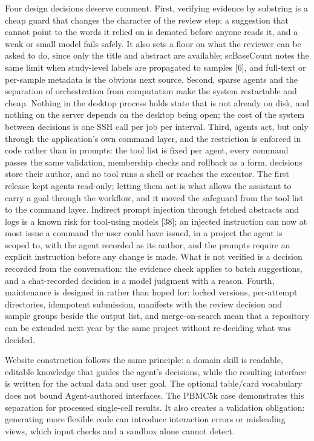 \documentclass[11pt,a4paper]{article}
\begin{document}
Four design decisions deserve comment. First, verifying evidence by
substring is a cheap guard that changes the character of the review
step: a suggestion that cannot point to the words it relied on is
demoted before anyone reads it, and a weak or small model fails safely.
It also sets a floor on what the reviewer can be asked to do, since only
the title and abstract are available; scBaseCount notes the same limit
when study-level labels are propagated to samples {[}6{]}, and full-text
or per-sample metadata is the obvious next source. Second, sparse agents
and the separation of orchestration from computation make the system
restartable and cheap. Nothing in the desktop process holds state that
is not already on disk, and nothing on the server depends on the desktop
being open; the cost of the system between decisions is one SSH call per
job per interval. Third, agents act, but only through the application's
own command layer, and the restriction is enforced in code rather than
in prompts: the tool list is fixed per agent, every command passes the
same validation, membership checks and rollback as a form, decisions
store their author, and no tool runs a shell or reaches the executor.
The first release kept agents read-only; letting them act is what allows
the assistant to carry a goal through the workflow, and it moved the
safeguard from the tool list to the command layer. Indirect prompt
injection through fetched abstracts and logs is a known risk for
tool-using models {[}38{]}; an injected instruction can now at most
issue a command the user could have issued, in a project the agent is
scoped to, with the agent recorded as its author, and the prompts
require an explicit instruction before any change is made. What is not
verified is a decision recorded from the conversation: the evidence
check applies to batch suggestions, and a chat-recorded decision is a
model judgment with a reason. Fourth, maintenance is designed in rather
than hoped for: locked versions, per-attempt directories, idempotent
submission, manifests with the review decision and sample groups beside
the output list, and merge-on-search mean that a repository can be
extended next year by the same project without re-deciding what was
decided.

Website construction follows the same principle: a domain skill is
readable, editable knowledge that guides the agent's decisions, while
the resulting interface is written for the actual data and user goal.
The optional table/card vocabulary does not bound Agent-authored
interfaces. The PBMC5k case demonstrates this separation for processed
single-cell results. It also creates a validation obligation: generating
more flexible code can introduce interaction errors or misleading views,
which input checks and a sandbox alone cannot detect.
\end{document}
